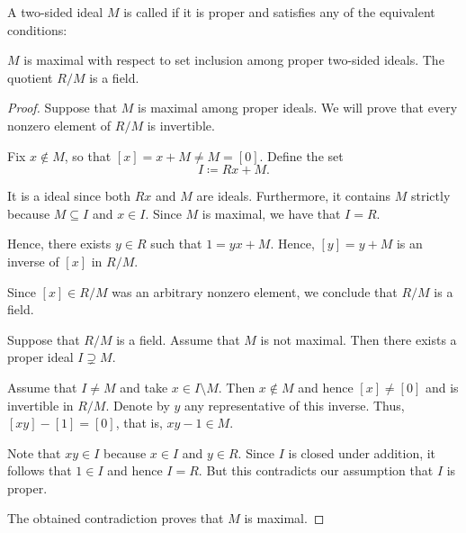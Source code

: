 \begin{definition}\label{def:maximal_ring_ideal}
  A two-sided ideal \( M \) is called  if it is proper and satisfies any of the equivalent conditions:
  \begin{thmenum}
     \( M \) is maximal with respect to set inclusion among proper two-sided ideals.
     The quotient \( R / M \) is a field.
  \end{thmenum}
\end{definition}
\begin{proof}
   Suppose that \( M \) is maximal among proper ideals. We will prove that every nonzero element of \( R / M \) is invertible.

  Fix \( x \not\in M \), so that \( [x] = x + M \neq M = [0] \). Define the set
  \begin{equation*}
    I \coloneqq Rx + M.
  \end{equation*}

  It is a ideal since both \( Rx \) and \( M \) are ideals. Furthermore, it contains \( M \) strictly because \( M \subseteq I \) and \( x \in I \). Since \( M \) is maximal, we have that \( I = R \).

  Hence, there exists \( y \in R \) such that \( 1 = yx + M \). Hence, \( [y] = y + M \) is an inverse of \( [x] \) in \( R / M \).

  Since \( [x] \in R / M \) was an arbitrary nonzero element, we conclude that \( R / M \) is a field.

   Suppose that \( R / M \) is a field. Assume that \( M \) is not maximal. Then there exists a proper ideal \( I \supsetneq M \).

  Assume that \( I \neq M \) and take \( x \in I \setminus M \). Then \( x \not\in M \) and hence \( [x] \neq [0] \) and is invertible in \( R / M \). Denote by \( y \) any representative of this inverse. Thus, \( [xy] - [1] = [0] \), that is, \( xy - 1 \in M \).

  Note that \( xy \in I \) because \( x \in I \) and \( y \in R \). Since \( I \) is closed under addition, it follows that \( 1 \in I \) and hence \( I = R \). But this contradicts our assumption that \( I \) is proper.

  The obtained contradiction proves that \( M \) is maximal.
\end{proof}

